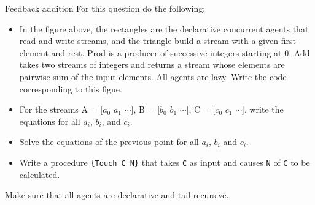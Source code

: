 
\def\date{Jun. 20, 2014}

\begin{Q1}{Feedback addition}
  For this question do the following:
  \begin{itemize}
    \item In the figure above, the rectangles are the declarative concurrent agents that read and write
      streams, and the triangle build a stream with a given first element and rest.
      Prod is a producer of successive integers starting at 0.
      Add takes two streams of integers and returns a stream whose
      elements are pairwise sum of the input elements.
      All agents are lazy.
      Write the code corresponding to this figue.
    \item For the streams
      A = [$a_0$ $a_1$ $\cdots$],
      B = [$b_0$ $b_1$ $\cdots$],
      C = [$c_0$ $c_1$ $\cdots$],
      write the equations for all $a_i$, $b_i$, and $c_i$.
    \item Solve the equations of the previous point for all $a_i$,
      $b_i$ and $c_i$.
    \item Write a procedure \lstinline|{Touch C N}| that takes
      \lstinline|C| as input and causes \lstinline|N| of \lstinline|C|
      to be calculated.
  \end{itemize}
  Make sure that all agents are declarative and tail-recursive.
\end{Q1}


